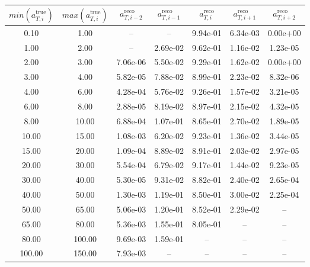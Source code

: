 \begin{tabular}{|cc||ccccc|} \hline 
$min(a^\mathrm{true}_{T,i})$ & $max(a^\mathrm{true}_{T,i})$ & $a^\mathrm{reco}_{T,i-2}$ & $a^\mathrm{reco}_{T,i-1}$ & $a^\mathrm{reco}_{T,i}$ & $a^\mathrm{reco}_{T,i+1}$ & $a^\mathrm{reco}_{T,i+2}$ \\ \hline 
 0.10 &  1.00 &  --  &  --  & 9.94e-01 & 6.34e-03 & 0.00e+00\\
 1.00 &  2.00 &  --  & 2.69e-02 & 9.62e-01 & 1.16e-02 & 1.23e-05\\
 2.00 &  3.00 & 7.06e-06 & 5.50e-02 & 9.29e-01 & 1.62e-02 & 0.00e+00\\
 3.00 &  4.00 & 5.82e-05 & 7.88e-02 & 8.99e-01 & 2.23e-02 & 8.32e-06\\
 4.00 &  6.00 & 4.28e-04 & 5.76e-02 & 9.26e-01 & 1.57e-02 & 3.21e-05\\
 6.00 &  8.00 & 2.88e-05 & 8.19e-02 & 8.97e-01 & 2.15e-02 & 4.32e-05\\
 8.00 & 10.00 & 6.88e-04 & 1.07e-01 & 8.65e-01 & 2.70e-02 & 1.89e-05\\
10.00 & 15.00 & 1.08e-03 & 6.20e-02 & 9.23e-01 & 1.36e-02 & 3.44e-05\\
15.00 & 20.00 & 1.09e-04 & 8.89e-02 & 8.91e-01 & 2.03e-02 & 2.97e-05\\
20.00 & 30.00 & 5.54e-04 & 6.79e-02 & 9.17e-01 & 1.44e-02 & 9.23e-05\\
30.00 & 40.00 & 5.30e-05 & 9.31e-02 & 8.82e-01 & 2.40e-02 & 2.65e-04\\
40.00 & 50.00 & 1.30e-03 & 1.19e-01 & 8.50e-01 & 3.00e-02 & 2.25e-04\\
50.00 & 65.00 & 5.06e-03 & 1.20e-01 & 8.52e-01 & 2.29e-02 &  -- \\
65.00 & 80.00 & 5.36e-03 & 1.55e-01 & 8.05e-01 &  --  &  -- \\
80.00 & 100.00 & 9.69e-03 & 1.59e-01 &  --  &  --  &  -- \\
100.00 & 150.00 & 7.93e-03 &  --  &  --  &  --  &  -- \\
\hline
\end{tabular}
